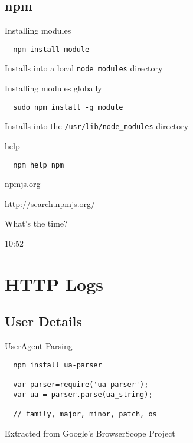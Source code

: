 \documentclass{beamer}
\begin{document}
\subsection{npm}
\begin{frame}[fragile]{Installing modules}
\begin{verbatim}
  npm install module
\end{verbatim}
Installs into a local \texttt{node\_modules} directory
\end{frame}


\begin{frame}[fragile]{Installing modules globally}
\begin{verbatim}
  sudo npm install -g module
\end{verbatim}
Installs into the \texttt{/usr/lib/node\_modules} directory
\end{frame}

\begin{frame}[fragile]{help}
\begin{verbatim}
  npm help npm
\end{verbatim}
\end{frame}

\begin{frame}{npmjs.org}
\begin{center}
   http://search.npmjs.org/
\end{center}
\end{frame}

\begin{frame}{What's the time?}
\begin{center}
\LARGE 10:52
\end{center}
\end{frame}

\section{HTTP Logs}
\subsection{User Details}
\begin{frame}[fragile]{UserAgent Parsing}
\begin{verbatim}
  npm install ua-parser

  var parser=require('ua-parser');
  var ua = parser.parse(ua_string);

  // family, major, minor, patch, os
\end{verbatim}
Extracted from Google's BrowserScope Project
\end{frame}
\end{document}
